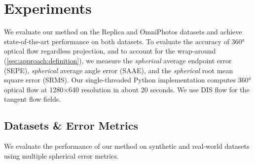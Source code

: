 \section{Experiments}
\label{sec:exp}

We evaluate our method on the Replica \cite{StrauWMCWGEMRVCYBYPYZLCBGMPSBSNGLN2019} and OmniPhotos \cite{BerteYLR2020} datasets and achieve state-of-the-art performance on both datasets.
%
To evaluate the accuracy of 360° optical flow regardless projection, and to account for the wrap-around (\cref{sec:approach:definition}), we measure the \emph{spherical} average endpoint error (SEPE), \emph{spherical} average angle error (SAAE), and the \emph{spherical} root mean square error (SRMS).
%
Our single-threaded Python implementation computes 360° optical flow at 1280$\times$640 resolution in about 20 seconds.
We use DIS flow \cite{KroegTDV2016} for the tangent flow fields.


\subsection{Datasets \& Error Metrics}
\label{sec:datasets-metrics}

We evaluate the performance of our method on synthetic and real-world datasets using multiple spherical error metrics.


